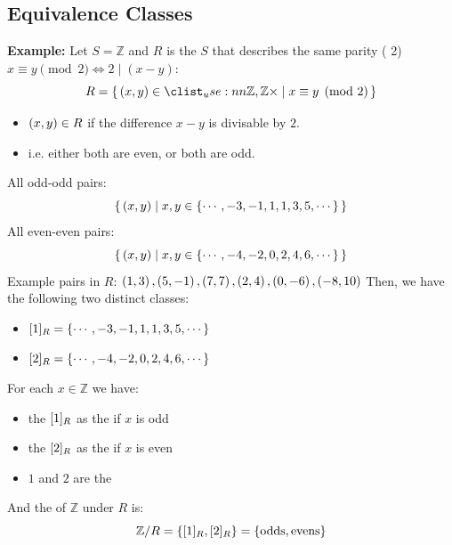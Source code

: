 \subsection{Equivalence Classes}\label{sec:equivclasses}


\textbf{Example: }Let $S = \mathbb{Z}$ and $R$ is the   $S$ that describes the same parity ( 2) $x \equiv y \pmod{2} \Leftrightarrow 2 \mid (x-y)$:
\[
R = \setbuilder{\paren{x,y} \in \cartprod{\mathbb{Z},\mathbb{Z}}}{x \equiv y \pmod{2}}
\]
\begin{itemize}
    \item $\left( x,y \right) \in R$ if the difference $x-y$ is divisable by $2$.
    \item i.e. either both are even, or both are odd.
\end{itemize}
All odd-odd pairs:
\[
\{\,\left( x,y \right) \mid x,y \in \left\{\cdots, -3, -1, 1, 1, 3, 5, \cdots\right\}\,\}
\]
All even-even pairs:
\[
\{\,\left( x,y \right) \mid x,y \in \left\{\cdots, -4, -2, 0, 2, 4, 6, \cdots\right\}\,\}
\]
Example pairs in $R$: $\left( 1,3 \right), \left( 5,-1 \right), \left( 7,7 \right),\left( 2,4 \right), \left( 0,-6 \right), \left( -8,10 \right)$
Then, we have the following two distinct classes:
\begin{itemize}
    \item $[1]_R = \left\{\cdots, -3, -1, 1, 1, 3, 5, \cdots\right\}$
    \item $[2]_R = \left\{\cdots, -4, -2, 0, 2, 4, 6, \cdots\right\}$
\end{itemize}
For each $x \in \mathbb{Z}$ we have:
\begin{itemize}
    \item the  $[1]_R$ as the  if $x$ is odd
    \item the  $[2]_R$ as the  if $x$ is even
    \item $1$ and $2$ are the 
\end{itemize}
And the   of $\mathbb{Z}$ under $R$ is:
\[
\mathbb{Z}/R = \left\{[1]_R, [2]_R\right\} = \left\{\text{odds}, \text{evens}\right\}
\]

